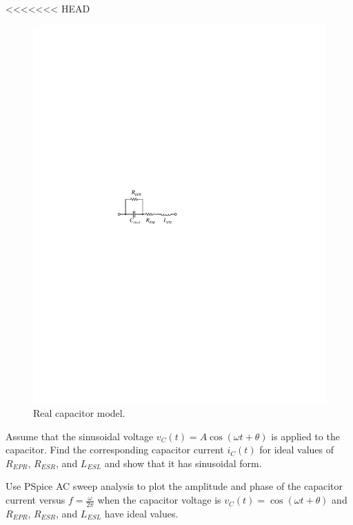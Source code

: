 \documentclass[11pt]{article}
\begin{document}
\begin{question}

<<<<<<< HEAD

\begin{figure}[H]
\centering
\includegraphics[scale=1.5,angle=0]{Fig/cir4.pdf}
\caption{Real capacitor model.} \label{fig:cir4}
\end{figure}

\begin{subquestion}{Assume that the sinusoidal voltage $v_C(t)=A\cos(\omega t+\theta)$ is applied to the capacitor. Find the corresponding capacitor current $i_C(t)$ for ideal values of $R_{EPR}$, $R_{ESR}$, and $L_{ESL}$ and show that it has sinusoidal form.} 
\answer{}
\end{subquestion}

\begin{subquestion}{Use PSpice AC sweep analysis to plot the amplitude and phase of the capacitor current versus $f=\frac{\omega}{2\pi}$ when the capacitor voltage is $v_C(t)=\cos(\omega t+\theta)$ and $R_{EPR}$, $R_{ESR}$, and $L_{ESL}$ have ideal values.} 
\answer{}
\end{subquestion}


\end{question}
\end{document}
